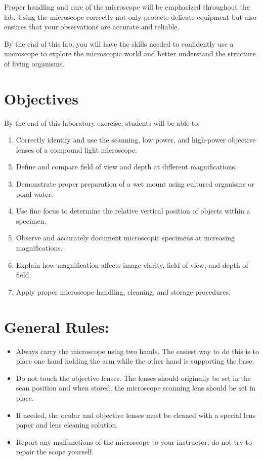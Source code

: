 \documentclass[
  letterpaper,
  DIV=11,
  numbers=noendperiod]{scrreprt}
\begin{document}
Proper handling and care of the microscope will be emphasized throughout
the lab. Using the microscope correctly not only protects delicate
equipment but also ensures that your observations are accurate and
reliable.

By the end of this lab, you will have the skills needed to confidently
use a microscope to explore the microscopic world and better understand
the structure of living organisms.

\section{\texorpdfstring{\textbf{Objectives}}{Objectives}}\label{objectives}

By the end of this laboratory exercise, students will be able to:

\begin{enumerate}
\def\labelenumi{\arabic{enumi}.}
\item
  Correctly identify and use the scanning, low power, and high-power
  objective lenses of a compound light microscope.
\item
  Define and compare field of view and depth at different
  magnifications.
\item
  Demonstrate proper preparation of a wet mount using cultured organisms
  or pond water.
\item
  Use fine focus to determine the relative vertical position of objects
  within a specimen.
\item
  Observe and accurately document microscopic specimens at increasing
  magnifications.
\item
  Explain how magnification affects image clarity, field of view, and
  depth of field.
\item
  Apply proper microscope handling, cleaning, and storage procedures.
\end{enumerate}

\section{\texorpdfstring{\textbf{General
Rules:}}{General Rules:}}\label{general-rules}

\begin{itemize}
\item
  Always carry the microscope using two hands. The easiest way to do
  this is to place one hand holding the arm while the other hand is
  supporting the base.
\item
  Do not touch the objective lenses. The lenses should originally be set
  in the scan position and when stored, the microscope scanning lens
  should be set in place.
\item
  If needed, the ocular and objective lenses must be cleaned with a
  special lens paper and lens cleaning solution.
\item
  Report any malfunctions of the microscope to your instructor; do not
  try to repair the scope yourself.
\end{itemize}
\end{document}
